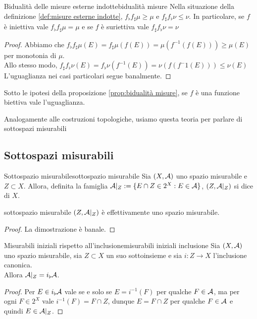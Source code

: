\documentclass{article}
\renewcommand\A{\mc{A}}
\begin{document}
\begin{proposition}{Bidualità delle misure esterne indotte}{bidualità misure}
    Nella situazione della definizione \ref{def:misure esterne indotte}, $f_\flat f_\sharp\mu \ge \mu$ e $f_\sharp f_\flat\nu \le \nu$. In particolare, se $f$ è iniettiva vale $f_\flat f_\sharp\mu = \mu$ e se $f$ è suriettiva vale $f_\sharp f_\flat\nu = \nu$
    \begin{proof}
        Abbiamo che $f_\flat f_\sharp\mu(E) = f_\sharp\mu(f(E)) = \mu(f^{-1}(f(E)))\ge \mu(E)$ per monotonia di $\mu$.\\
        Allo stesso modo, $f_\sharp f_\flat\nu(E) = f_\flat\nu(f^{-1}(E)) = \nu(f(f^-1(E))) \le \nu(E)$\\
        L'uguaglianza nei casi particolari segue banalmente.
    \end{proof}
\end{proposition}
\begin{corollary}{}{}
    Sotto le ipotesi della proposizione \ref{prop:bidualità misure}, se $f$ è una funzione biettiva vale l'uguaglianza.
\end{corollary}

Analogamente alle costruzioni topologiche, usiamo questa teoria per parlare di sottospazi misurabili

\pagebreak
\subsection{Sottospazi misurabili}

\begin{definition}{Sottospazio misurabile}{sottospazio misurabile}
    Sia $(X,\A)$ uno spazio misurabile e $Z\subset X$. Allora, definita la famiglia $\A|_Z := \{E\cap Z \in 2^X : E\in \A\}$, $(Z, \A|_Z)$ si dice  di $X$.
\end{definition}
\begin{remark}{}{sottospazio misurabile}
    $(Z,\A|_Z)$ è effettivamente uno spazio misurabile.
    \begin{proof}
        La dimostrazione è banale.
    \end{proof}
\end{remark}

\begin{proposition}{Misurabili iniziali rispetto all'inclusione}{misurabili iniziali inclusione}
    Sia $(X,\A)$ uno spazio misurabile, sia $Z\subset X$ un suo sottoinsieme e sia $i : Z \to X$ l'inclusione canonica.\\
    Allora $\A|_Z = i_\flat \A$.
    \begin{proof}
        Per $E \in i_\flat \A$ vale se e solo se $E = i^{-1}(F)$ per qualche $F \in \A$, ma per ogni $F \in 2^X$ vale $i^{-1}(F) = F \cap Z$, dunque $E = F\cap Z$ per qualche $F \in \A$ e quindi $E \in \A|_Z$.
    \end{proof}
\end{proposition}
\end{document}
